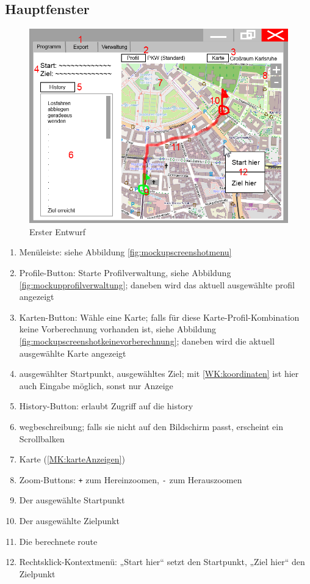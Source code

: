 \documentclass[a4paper, 11pt]{article}
\begin{document}
\subsection{Hauptfenster}
\begin{figure}[H]
\centering
\includegraphics[width=0.7\linewidth]{mockup_screenshot_main}
\caption{Erster Entwurf}
\label{fig:mockupscreenshotmain}
\end{figure}
\begin{enumerate}
\item Menüleiste: siehe Abbildung \ref{fig:mockupscreenshotmenu}
\item Profile-Button: Starte Profilverwaltung, siehe Abbildung \ref{fig:mockupprofilverwaltung}; daneben wird das aktuell ausgewählte \gls{profil} angezeigt
\item Karten-Button: Wähle eine Karte; falls für diese Karte-Profil-Kombination keine Vorberechnung vorhanden ist, siehe Abbildung \ref{fig:mockupscreenshotkeinevorberechnung}; daneben wird die aktuell ausgewählte Karte angezeigt
\item ausgewählter Startpunkt, ausgewähltes Ziel; mit \ref{WK:koordinaten} ist hier auch Eingabe möglich, sonst nur Anzeige
\item History-Button: erlaubt Zugriff auf die \gls{history}
\item \gls{wegbeschreibung}; falls sie nicht auf den Bildschirm passt, erscheint ein Scrollbalken
\item Karte (\ref{MK:karteAnzeigen})
\item Zoom-Buttons: \texttt{+} zum Hereinzoomen, \texttt{-} zum Herauszoomen
\item Der ausgewählte Startpunkt
\item Der ausgewählte Zielpunkt
\item Die berechnete \gls{route}
\item Rechtsklick-Kontextmenü: „Start hier“ setzt den Startpunkt, „Ziel hier“ den Zielpunkt
\end{enumerate}
\end{document}

